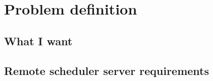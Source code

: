 \section{Problem definition}\label{sec:problem-definition}

\subsection{What I want}\label{subsec:what-i-want}

\subsection{Remote scheduler server requirements}\label{subsec:remote-scheduler-server-requirements}
